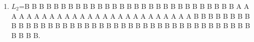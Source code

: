 \documentclass{ctexart}
\begin{document}
\begin{enumerate}
\begin{enumerate}
\begin{enumerate}
\item \(L_2\)=B B B B B B B B B B B B B B B B B B B B B B B B B B B B B A A A A A A A A A A A A A A A A A A A A A A A A A A B B B B B B B B B B B B B B B B B B B B B B B B B B B B B B B B B B B B B B B B B B B B B.
\end{enumerate}
 
 
 

\end{enumerate}




\end{enumerate}
\end{document}
